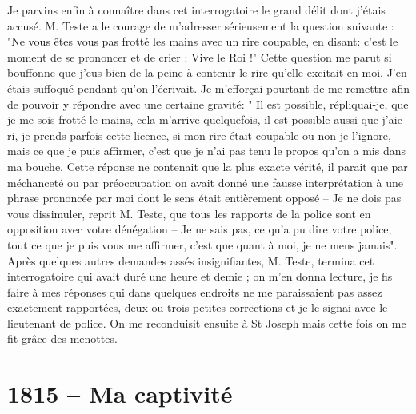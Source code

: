 \documentclass[11pt,a4paper]{report}
\begin{document}
Je parvins enfin à connaître dans cet interrogatoire le grand délit dont j'étais accusé. M. Teste a le courage de m'adresser sérieusement la question suivante : "Ne vous êtes vous pas frotté les mains avec un rire coupable, en disant: c'est le moment de se prononcer et de crier : Vive le Roi !" Cette question me parut si bouffonne que j'eus bien de la peine à contenir le rire qu'elle excitait en moi. J'en étais suffoqué pendant qu'on l'écrivait. Je m'efforçai pourtant de me remettre afin de pouvoir y répondre avec une certaine gravité: " Il est possible, répliquai-je, que je me sois frotté le mains, cela m'arrive quelquefois, il est possible aussi que j'aie ri, je prends parfois cette licence, si mon rire était coupable ou non je l'ignore, mais ce que je puis affirmer, c'est que je n'ai pas tenu le propos qu'on a mis dans ma bouche. Cette réponse ne contenait que la plus exacte vérité, il parait que par méchanceté ou par préoccupation on avait donné une fausse interprétation à une phrase prononcée par moi dont le sens était entièrement opposé -- Je ne dois pas vous dissimuler, reprit M. Teste, que tous les rapports de la police sont en opposition avec votre dénégation -- Je ne sais pas, ce qu'a pu dire votre police, tout ce que je puis vous me affirmer, c'est que quant à moi, je ne mens jamais". Après quelques autres demandes assés insignifiantes, M. Teste, termina cet interrogatoire qui avait duré une heure et demie ; on m'en donna lecture, je fis faire à mes réponses qui dans quelques endroits ne me paraissaient pas assez exactement rapportées, deux ou trois petites corrections et je le signai avec le lieutenant de police. On me reconduisit ensuite à St Joseph mais cette fois on me fit grâce des menottes.

\section*{1815 -- Ma captivité}
\end{document}

